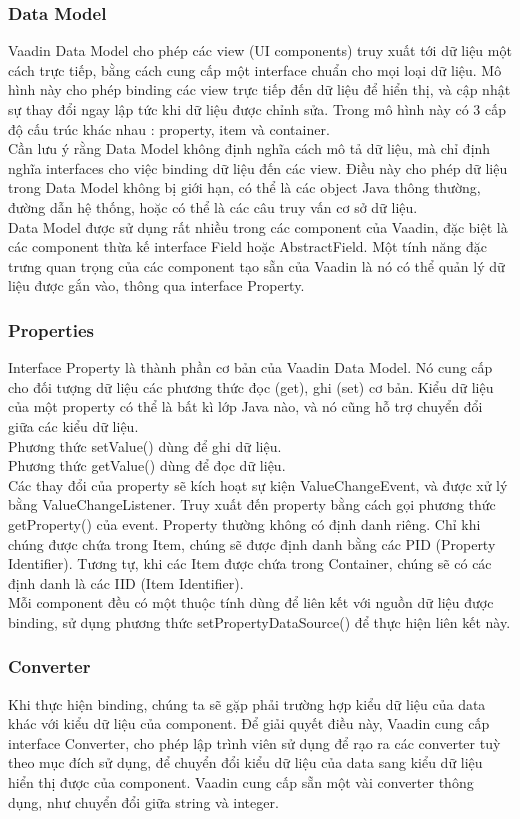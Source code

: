 \subsubsection{Data Model}
Vaadin Data Model cho phép các view (UI components) truy xuất tới dữ liệu một cách trực tiếp, bằng cách cung cấp một interface chuẩn cho mọi loại dữ liệu. Mô hình này cho phép binding các view trực tiếp đến dữ liệu để hiển thị, và cập nhật sự thay đổi ngay lập tức khi dữ liệu được chỉnh sửa. Trong mô hình này có 3 cấp độ cấu trúc khác nhau : property, item và container.
\\
Cần lưu ý rằng Data Model không định nghĩa cách mô tả dữ liệu, mà chỉ định nghĩa interfaces cho việc binding dữ liệu đến các view. Điều này cho phép dữ liệu trong Data Model không bị giới hạn, có thể là các object Java thông thường, đường dẫn hệ thống, hoặc có thể là các câu truy vấn cơ sở dữ liệu.
\\
Data Model được sử dụng rất nhiều trong các component của Vaadin, đặc biệt là các component thừa kế interface Field hoặc AbstractField. Một tính năng đặc trưng quan trọng của các component tạo sẵn của Vaadin là nó có thể quản lý dữ liệu được gắn vào, thông qua interface Property.
\subsubsection{Properties}
Interface Property là thành phần cơ bản của Vaadin Data Model. Nó cung cấp cho đối tượng dữ liệu các phương thức đọc (get), ghi (set) cơ bản. Kiểu dữ liệu của một property có thể là bất kì lớp Java nào, và nó cũng hỗ trợ chuyển đổi giữa các kiểu dữ liệu.
\\
Phương thức setValue() dùng để ghi dữ liệu.
\\
Phương thức getValue() dùng để đọc dữ liệu.
\\
Các thay đổi của property sẽ kích hoạt sự kiện ValueChangeEvent, và được xử lý bằng ValueChangeListener. Truy xuất đến property bằng cách gọi phương thức getProperty() của event. Property thường không có định danh riêng. Chỉ khi chúng được chứa trong Item, chúng sẽ được định danh bằng các PID (Property Identifier). Tương tự, khi các Item được chứa trong Container, chúng sẽ có các định danh là các IID (Item Identifier).
\\
Mỗi component đều có một thuộc tính dùng để liên kết với nguồn dữ liệu được binding, sử dụng phương thức setPropertyDataSource() để thực hiện liên kết này.
\subsubsection{Converter}
Khi thực hiện binding, chúng ta sẽ gặp phải trường hợp kiểu dữ liệu của data khác với kiểu dữ liệu của component. Để giải quyết điều này, Vaadin cung cấp interface Converter, cho phép lập trình viên sử dụng để rạo ra các converter tuỳ theo mục đích sử dụng, để chuyển đổi kiểu dữ liệu của data sang kiểu dữ liệu hiển thị được của component. Vaadin cung cấp sẵn một vài converter thông dụng, như chuyển đổi giữa string và integer.
